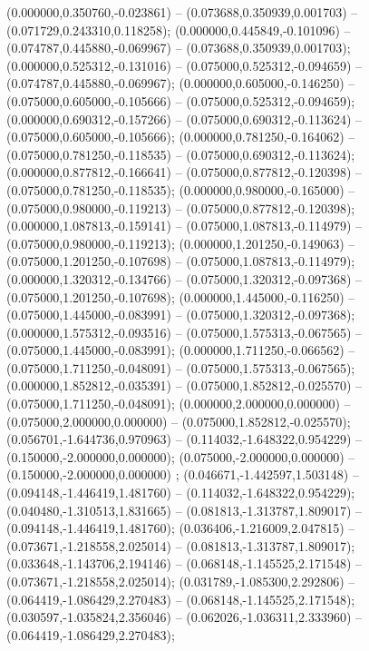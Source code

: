  (0.000000,0.350760,-0.023861) -- (0.073688,0.350939,0.001703) -- (0.071729,0.243310,0.118258);
 (0.000000,0.445849,-0.101096) -- (0.074787,0.445880,-0.069967) -- (0.073688,0.350939,0.001703);
 (0.000000,0.525312,-0.131016) -- (0.075000,0.525312,-0.094659) -- (0.074787,0.445880,-0.069967);
 (0.000000,0.605000,-0.146250) -- (0.075000,0.605000,-0.105666) -- (0.075000,0.525312,-0.094659);
 (0.000000,0.690312,-0.157266) -- (0.075000,0.690312,-0.113624) -- (0.075000,0.605000,-0.105666);
 (0.000000,0.781250,-0.164062) -- (0.075000,0.781250,-0.118535) -- (0.075000,0.690312,-0.113624);
 (0.000000,0.877812,-0.166641) -- (0.075000,0.877812,-0.120398) -- (0.075000,0.781250,-0.118535);
 (0.000000,0.980000,-0.165000) -- (0.075000,0.980000,-0.119213) -- (0.075000,0.877812,-0.120398);
 (0.000000,1.087813,-0.159141) -- (0.075000,1.087813,-0.114979) -- (0.075000,0.980000,-0.119213);
 (0.000000,1.201250,-0.149063) -- (0.075000,1.201250,-0.107698) -- (0.075000,1.087813,-0.114979);
 (0.000000,1.320312,-0.134766) -- (0.075000,1.320312,-0.097368) -- (0.075000,1.201250,-0.107698);
 (0.000000,1.445000,-0.116250) -- (0.075000,1.445000,-0.083991) -- (0.075000,1.320312,-0.097368);
 (0.000000,1.575312,-0.093516) -- (0.075000,1.575313,-0.067565) -- (0.075000,1.445000,-0.083991);
 (0.000000,1.711250,-0.066562) -- (0.075000,1.711250,-0.048091) -- (0.075000,1.575313,-0.067565);
 (0.000000,1.852812,-0.035391) -- (0.075000,1.852812,-0.025570) -- (0.075000,1.711250,-0.048091);
 (0.000000,2.000000,0.000000) -- (0.075000,2.000000,0.000000) -- (0.075000,1.852812,-0.025570);
 (0.056701,-1.644736,0.970963) -- (0.114032,-1.648322,0.954229) -- (0.150000,-2.000000,0.000000);
 (0.075000,-2.000000,0.000000) -- (0.150000,-2.000000,0.000000) ;
 (0.046671,-1.442597,1.503148) -- (0.094148,-1.446419,1.481760) -- (0.114032,-1.648322,0.954229);
 (0.040480,-1.310513,1.831665) -- (0.081813,-1.313787,1.809017) -- (0.094148,-1.446419,1.481760);
 (0.036406,-1.216009,2.047815) -- (0.073671,-1.218558,2.025014) -- (0.081813,-1.313787,1.809017);
 (0.033648,-1.143706,2.194146) -- (0.068148,-1.145525,2.171548) -- (0.073671,-1.218558,2.025014);
 (0.031789,-1.085300,2.292806) -- (0.064419,-1.086429,2.270483) -- (0.068148,-1.145525,2.171548);
 (0.030597,-1.035824,2.356046) -- (0.062026,-1.036311,2.333960) -- (0.064419,-1.086429,2.270483);
